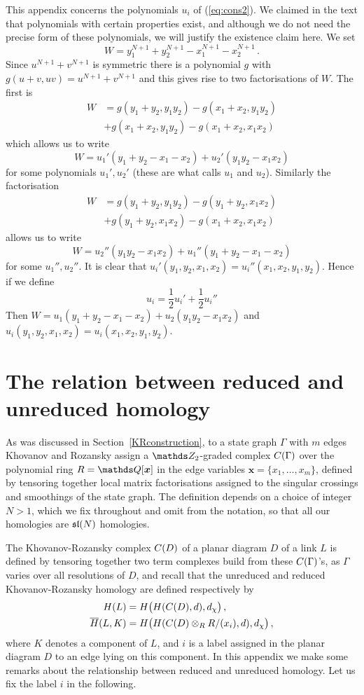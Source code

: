 \documentclass{compositio}
\theoremstyle{definition}
\numberwithin{equation}{section}
\begin{document}
This appendix concerns the polynomials $u_i$ of (\ref{eq:cons2}). We claimed in the text that polynomials with certain properties exist, and although we do not need the precise form of these polynomials, we will justify the existence claim here. We set
\[
W = y_1^{N+1} + y_2^{N+1} - x_1^{N+1} - x_2^{N+1}\,.
\]
Since $u^{N+1} + v^{N+1}$ is symmetric there is a polynomial $g$ with $g(u+v, uv) = u^{N+1} + v^{N+1}$ and this gives rise to two factorisations of $W$. The first is
\begin{align*}
W &= g(y_1+y_2,y_1y_2) - g(x_1+x_2,y_1y_2)\\
&+ g(x_1+x_2,y_1y_2) - g(x_1+x_2,x_1x_2)\,
\end{align*}
which allows us to write
\[
W = u_1'(y_1 + y_2 - x_1 -x_2) + u_2'(y_1y_2 - x_1x_2)
\]
for some polynomials $u_1', u_2'$ (these are what \cite[p.48]{kr0401268} calls $u_1$ and $u_2$). Similarly the factorisation
\begin{align*}
W &= g(y_1+y_2,y_1y_2) - g(y_1+y_2,x_1x_2)\\
&+ g(y_1+y_2,x_1x_2) - g(x_1+x_2,x_1x_2)
\end{align*}
allows us to write
\[
W = u_2''(y_1y_2-x_1x_2) + u_1''(y_1+y_2-x_1-x_2)
\]
for some $u_1'', u_2''$. It is clear that $u_i'(y_1,y_2,x_1,x_2) = u_i''(x_1,x_2,y_1,y_2)$. Hence if we define
\[
u_i = \frac{1}{2}u_i' + \frac{1}{2}u_i''
\]
Then $W = u_1(y_1 + y_2 - x_1 - x_2) + u_2(y_1y_2-x_1x_2)$ and $u_i(y_1,y_2,x_1,x_2) = u_i(x_1,x_2,y_1,y_2)$.

\section{The relation between reduced and unreduced homology}
\label{relationReducedUnreduced}

As was discussed in Section~\ref{KRconstruction}, to a state graph $\Gamma$ with $m$ edges Khovanov and Rozansky assign a $\Ztwo$-graded complex $C(\Gamma)$ over the polynomial ring $R = \QQ[\boldsymbol{x}]$ in the edge variables $\boldsymbol{x} = \{x_1,\ldots,x_m\}$, defined by tensoring together local matrix factorisations assigned to the singular crossings and smoothings of the state graph. The definition depends on a choice of integer $N > 1$, which we fix throughout and omit from the notation, so that all our homologies are $\mathfrak{sl}(N)$ homologies.

The Khovanov-Rozansky complex $C(D)$ of a planar diagram $D$ of a link $L$ is defined by tensoring together two term complexes build from these $C(\Gamma)$'s, as $\Gamma$ varies over all resolutions of $D$, and recall that the unreduced and reduced Khovanov-Rozansky homology are defined respectively by
\begin{align*}
H(L) &= H\big( H(C(D),d), d_{\chi} \big) \, ,\\
\overline{H}(L, K) &= H\big( H( C(D) \otimes_{R} R/(x_i), d), d_{\chi} \big) \, ,
\end{align*}
where $K$ denotes a component of $L$, and $i$ is a label assigned in the planar diagram $D$ to an edge lying on this component. In this appendix we make some remarks about the relationship between reduced and unreduced homology. Let us fix the label $i$ in the following.
\end{document}

